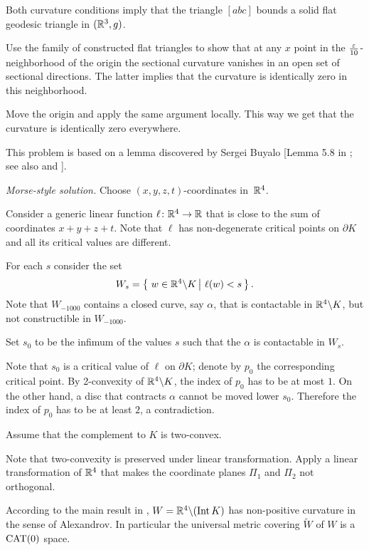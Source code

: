 Both curvature conditions imply that the triangle $[abc]$ bounds a solid flat geodesic triangle in   $(\mathbb{R}^3,g)$.

Use the family of constructed flat triangles to show that at any $x$ point in the $\tfrac{\varepsilon}{10}$-neighborhood of the origin the sectional curvature vanishes in an open set of sectional directions.
The latter implies that the curvature is identically zero 
in this neighborhood.

Move the origin and apply the same argument locally.
This way we get that the curvature is identically zero everywhere.
\qeds

This problem is based on a lemma discovered by Sergei Buyalo [Lemma 5.8 in ; see also  and ].

\textit{Morse-style solution.}
Choose $(x,y,z,t)$-coordinates in~$\mathbb{R}^4$.

Consider a generic linear function $\ell\colon\mathbb{R}^4\to\mathbb{R}$ that is close to the sum of coordinates $x+y+z+t$.
Note that $\ell$
has non-degenerate critical points on $\partial K$ and all its critical values are different.

For each $s$ consider the set 
$$W_s=\set{w\in \RR^4\backslash K}{\ell(w)<s}.$$
Note that $W_{-1000}$ contains a closed curve, say $\alpha$, that is contactable in $\mathbb{R}^4\backslash K$, but not constructible in $W_{-1000}$.

Set $s_0$ to be the infimum of the values $s$ such that
the $\alpha$ is contactable in $W_s$.

Note that $s_0$ is a critical value of $\ell$ on $\partial K$;
denote by $p_0$ the corresponding critical point.
By 2-convexity of $\mathbb{R}^4\backslash K$,
the index of $p_0$ has to be at most $1$.
On the other hand, a disc that contracts $\alpha$ cannot be moved lower $s_0$.
Therefore the index of $p_0$ has to be at least $2$, a contradiction.
\qeds

Assume that the complement to $K$ is two-convex.

Note that two-convexity is preserved under linear transformation.
Apply a linear transformation of $\mathbb{R}^4$ that makes the coordinate planes $\Pi_1$ and $\Pi_2$ not orthogonal.

According to the main result in \cite{ABB}, $W\z=\RR^4\backslash (\Int K)$ has non-positive curvature in the sense of Alexandrov.
In particular the universal metric covering $\tilde W$ of $W$ is a $\operatorname{\rm CAT}\nolimits(0)$ space.

